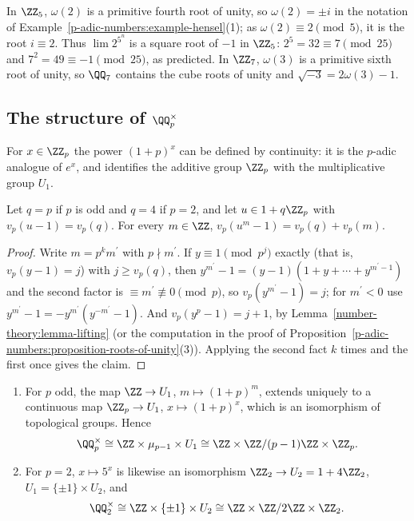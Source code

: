 \begin{example}\label{p-adic-numbers:example-teichmuller}
In $\ZZ_5$, $\omega(2)$ is a primitive fourth root of unity, so $\omega(2) = \pm i$ in the notation of Example~\ref{p-adic-numbers:example-hensel}(1); as $\omega(2) \equiv 2 \pmod 5$, it is the root
$i \equiv 2$. Thus $\lim 2^{5^n}$ is a square root of $-1$ in $\ZZ_5$: $2^5 = 32 \equiv 7 \pmod{25}$ and $7^2 = 49 \equiv -1 \pmod{25}$, as predicted. In $\ZZ_7$, $\omega(3)$ is a primitive sixth root of
unity, so $\QQ_7$ contains the cube roots of unity and $\sqrt{-3} = 2\omega(3) - 1$.
\end{example}

\subsection{The structure of $\QQ_p^\times$}\label{p-adic-numbers:subsection-structure}

For $x \in \ZZ_p$ the power $(1 + p)^x$ can be defined by continuity: it is the $p$-adic analogue of $e^x$, and identifies the additive group $\ZZ_p$ with the multiplicative group $U_1$.

\begin{lemma}\label{p-adic-numbers:lemma-power-valuation}
Let $q = p$ if $p$ is odd and $q = 4$ if $p = 2$, and let $u \in 1 + q\ZZ_p$ with $v_p(u - 1) = v_p(q)$. For every $m \in \ZZ$, $v_p(u^m - 1) = v_p(q) + v_p(m)$.
\end{lemma}

\begin{proof}
Write $m = p^km^{\prime}$ with $p \nmid m^{\prime}$. If $y \equiv 1 \pmod{p^j}$ exactly (that is, $v_p(y - 1) = j$) with $j \geq v_p(q)$, then $y^{m^{\prime}} - 1 = (y - 1)(1 + y + \cdots + y^{m^{\prime}-1})$ and the second factor is
$\equiv m^{\prime} \not\equiv 0 \pmod p$, so $v_p(y^{m^{\prime}} - 1) = j$; for $m^{\prime} < 0$ use $y^{m^{\prime}} - 1 = -y^{m^{\prime}}(y^{-m^{\prime}} - 1)$. And $v_p(y^p - 1) = j + 1$, by Lemma~\ref{number-theory:lemma-lifting} (or the computation in
the proof of Proposition~\ref{p-adic-numbers:proposition-roots-of-unity}(3)). Applying the second fact $k$ times and the first once gives the claim.
\end{proof}

\begin{theorem}\label{p-adic-numbers:theorem-structure}
\begin{enumerate}
\item For $p$ odd, the map $\ZZ \to U_1$, $m \mapsto (1 + p)^m$, extends uniquely to a continuous map $\ZZ_p \to U_1$, $x \mapsto (1 + p)^x$, which is an isomorphism of topological groups. Hence
\[
\QQ_p^\times \cong \ZZ \times \mu_{p-1} \times U_1 \cong \ZZ \times \ZZ/(p - 1)\ZZ \times \ZZ_p .
\]
\item For $p = 2$, $x \mapsto 5^x$ is likewise an isomorphism $\ZZ_2 \to U_2 = 1 + 4\ZZ_2$, $U_1 = \{\pm1\} \times U_2$, and
\[
\QQ_2^\times \cong \ZZ \times \{\pm1\} \times U_2 \cong \ZZ \times \ZZ/2\ZZ \times \ZZ_2 .
\]
\end{enumerate}
\end{theorem}

